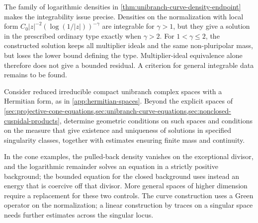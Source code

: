 The family of logarithmic densities in \cref{thm:unibranch-curve-density-endpoint} makes the integrability issue precise. Densities on the normalization with local form $C_0|z|^{-2}(\log(1/|z|))^{-\gamma}$ are integrable for $\gamma>1$, but they give a solution in the prescribed ordinary type exactly when $\gamma>2$. For $1<\gamma\leq2$, the constructed solution keeps all multiplier ideals and the same non-pluripolar mass, but loses the lower bound defining the type. Multiplier-ideal equivalence alone therefore does not give a bounded residual. A criterion for general integrable data remains to be found.

\begin{problem}\label{qu:singular-space-equations-program}
Consider reduced irreducible compact unibranch complex spaces with a Hermitian form, as in \cref{app:hermitian-spaces}. Beyond the explicit spaces of \cref{sec:projective-cone-equations,sec:unibranch-curve-equations,sec:nonclosed-cuspidal-products}, determine geometric conditions on such spaces and conditions on the measure that give existence and uniqueness of solutions in specified singularity classes, together with estimates ensuring finite mass and continuity.
\end{problem}

In the cone examples, the pulled-back density vanishes on the exceptional divisor, and the logarithmic remainder solves an equation in a strictly positive background; the bounded equation for the closed background uses instead an energy that is coercive off that divisor. More general spaces of higher dimension require a replacement for these two controls. The curve construction uses a Green operator on the normalization; a linear construction by traces on a singular space needs further estimates across the singular locus.

\par\endgroup
